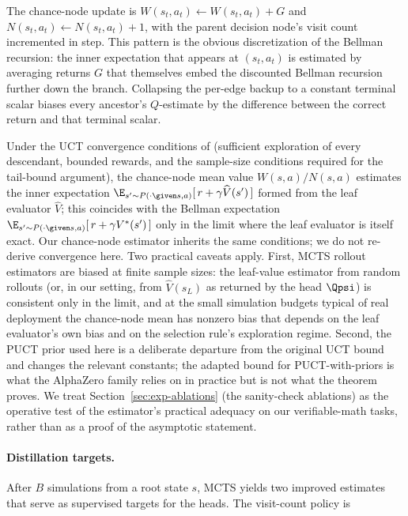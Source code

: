 The chance-node update is
$W(s_t, a_t) \gets W(s_t, a_t) + G$ and
$N(s_t, a_t) \gets N(s_t, a_t) + 1$, with the parent decision node's
visit count incremented in step. This pattern is the obvious
discretization of the Bellman recursion: the inner expectation that
appears at $(s_t, a_t)$ is estimated by averaging returns $G$ that
themselves embed the discounted Bellman recursion further down the
branch. Collapsing the per-edge backup to a constant terminal scalar
biases every ancestor's $Q$-estimate by the difference between the
correct return and that terminal scalar.

\begin{remark}
\label{rem:mcts-consistency}
Under the UCT convergence conditions of \citet{kocsis2006bandit}
(sufficient exploration of every descendant, bounded rewards, and the
sample-size conditions required for the tail-bound argument), the
chance-node mean value $W(s, a) / N(s, a)$ estimates the inner expectation
$\E_{s' \sim P(\cdot \given s, a)}[\, r + \gamma \widehat{V}(s') \,]$ formed
from the leaf evaluator $\widehat{V}$; this coincides with the Bellman
expectation $\E_{s' \sim P(\cdot \given s, a)}[\, r + \gamma V^{\ast}(s') \,]$
only in the limit where the leaf evaluator is itself exact. Our
chance-node estimator inherits the same conditions; we do not re-derive
convergence here. Two practical caveats apply. First, MCTS rollout
estimators are biased at finite sample sizes: the leaf-value estimator
from random rollouts (or, in our setting, from $\widehat{V}(s_L)$ as
returned by the head $\Qpsi$) is consistent only in the limit, and at
the small simulation budgets typical of real deployment the chance-node
mean has nonzero bias that depends on the leaf evaluator's own bias and
on the selection rule's exploration regime. Second, the PUCT prior used
here is a deliberate departure from the original UCT bound and changes
the relevant constants; the adapted bound for PUCT-with-priors is what
the AlphaZero family relies on in practice but is not what the
\citet{kocsis2006bandit} theorem proves. We treat Section~\ref{sec:exp-ablations}
(the sanity-check ablations) as the operative test of the estimator's
practical adequacy on our verifiable-math tasks, rather than as a proof of the
asymptotic statement.
\end{remark}

\paragraph{Distillation targets.}
After $B$ simulations from a root state $s$, MCTS yields two improved
estimates that serve as supervised targets for the heads. The visit-count
policy is

